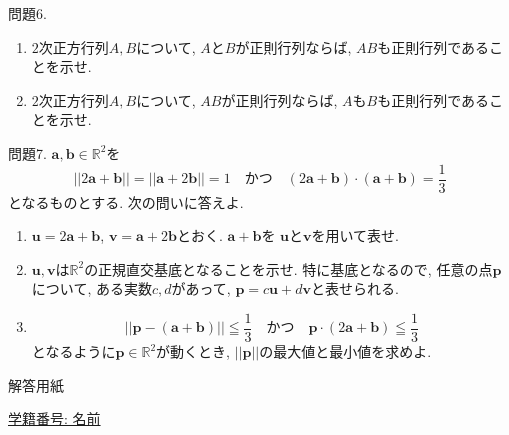 \documentclass[dvipdfmx,a4paper,11pt]{article}
\newcommand{\R}{\mathbb{R}}
\theoremstyle{definition}
\begin{document}
 
  問題6. 
   \begin{enumerate}
     \setlength{\parskip}{0cm} %
  \setlength{\itemsep}{0cm} 
   \item $2$次正方行列$A, B$について, $A$と$B$が正則行列ならば,  $AB$も正則行列であることを示せ. 
  \item $2$次正方行列$A, B$について, $AB$が正則行列ならば, $A$も$B$も正則行列であることを示せ.
  \end{enumerate}
 
 問題7. 
  $\bm{a}, \bm{b} \in \R^2$を
  $$|| 2\bm{a}+\bm{b}|| =|| \bm{a}+2\bm{b}|| =1 \quad\text{かつ} \quad (2\bm{a}+\bm{b})\cdot (\bm{a}+\bm{b})=\frac{1}{3}$$
 となるものとする. 
 次の問いに答えよ.
\begin{enumerate}
   \setlength{\parskip}{0cm} %
  \setlength{\itemsep}{0cm} 
\item $\bm{u}=2\bm{a}+\bm{b}$, $\bm{v}=\bm{a}+2\bm{b}$とおく. $\bm{a}+\bm{b}$を $\bm{u}$と$\bm{v}$を用いて表せ.
\item $\bm{u}, \bm{v}$は$\R^2$の正規直交基底となることを示せ. 特に基底となるので, 任意の点$\bm{p}$について, ある実数$c,d$があって, $\bm{p}=c\bm{u}+d\bm{v}$と表せられる.
\item   $$||\bm{p} - (\bm{a}+\bm{b})|| \leqq \frac{1}{3} \quad\text{かつ} \quad \bm{p} \cdot (2\bm{a}+\bm{b})\leqq \frac{1}{3}$$
となるように$\bm{p} \in \R^2$が動くとき, $||\bm{p}||$の最大値と最小値を求めよ. 
   \end{enumerate}
 
 \newpage
 
  \begin{center}
 {\Large 解答用紙}
\end{center}


\begin{flushleft}
{ \large \underline{学籍番号: \hspace{4cm} 名前  \hspace{9cm}   }  }
\end{flushleft}
 

 
\end{document}
